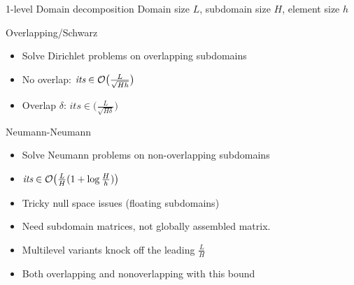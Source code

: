 \begin{frame}{1-level Domain decomposition}
  Domain size $L$, subdomain size $H$, element size $h$
  \begin{block}{Overlapping/Schwarz}
    \begin{itemize}\item Solve Dirichlet problems on overlapping
      subdomains
    \item No overlap: $\textit{its} \in \mathcal{O}\big( \frac{L}{\sqrt{Hh}} \big)$
    \item Overlap $\delta$: $\textit{its} \in \big( \frac L {\sqrt{H\delta}} \big)$
    \end{itemize}
  \end{block}
  \vspace{-1ex}
  \begin{block}{Neumann-Neumann}
    \begin{itemize}
    \item Solve Neumann problems on non-overlapping subdomains
    \item $\textit{its} \in \mathcal{O}\big( \frac{L}{H}(1+\log\frac H h) \big)$
    \item Tricky null space issues (floating subdomains)
    \item Need subdomain matrices, not globally assembled matrix.
    \end{itemize}
  \end{block}
  \begin{itemize}
  \item Multilevel variants knock off the leading $\frac L H$
  \item Both overlapping and nonoverlapping with this bound
  \end{itemize}
\end{frame}

